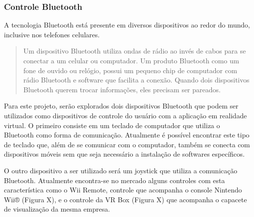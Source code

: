 \subsubsection{Controle Bluetooth}

A tecnologia Bluetooth está presente em diversos dispositivos ao redor do mundo, inclusive nos telefones celulares. 

\begin{quote}
Um dispositivo Bluetooth utiliza ondas de rádio ao invés de cabos para se conectar a um celular ou computador. Um produto Bluetooth como um fone de ouvido ou relógio, possui um pequeno chip de computador com rádio Bluetooth e software que facilita a conexão. Quando dois dispositivos Bluetooth querem trocar informações, eles precisam ser pareados. \cite[tradução nossa]{bluetooth}
\end{quote}

Para este projeto, serão explorados dois dispositivos Bluetooth que podem ser utilizados como dispositivos de controle do usuário com a aplicação em realidade virtual. O primeiro consiste em um teclado de computador que utiliza o Bluetooth como forma de comunicação. Atualmente é possível encontrar este tipo de teclado que, além de se comunicar com o computador, também se conecta com dispositivos móveis sem que seja necessário a instalação de softwares específicos. 

O outro dispositivo a ser utilizado será um joystick que utiliza a comunicação Bluetooth. Atualmente encontra-se no mercado alguns controles com esta característica como o Wii Remote, controle que acompanha o console Nintendo Wii® (Figura X), e o controle da VR Box (Figura X) que acompanha o capacete de visualização da mesma empresa.


